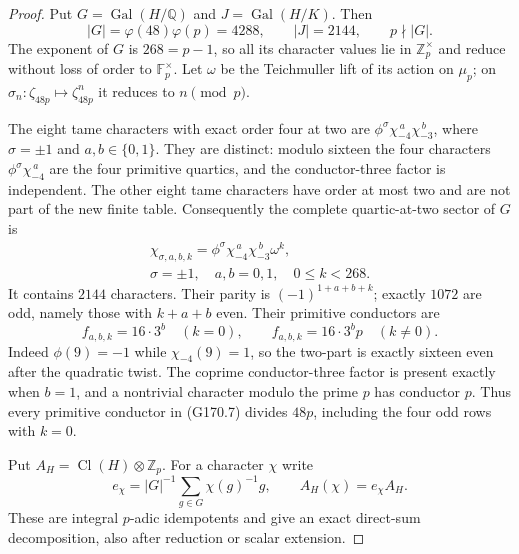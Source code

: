 \begin{proof}
Put $G=\operatorname{Gal}(H/\mathbb Q)$ and
$J=\operatorname{Gal}(H/K)$.
Then
\[
 |G|=\varphi(48)\varphi(p)=4288,\qquad
 |J|=2144,\qquad p\nmid|G|.
 \tag{G170.5}
\]
The exponent of $G$ is $268=p-1$, so all its character
values lie in $\mathbb Z_p^\times$ and reduce without loss
of order to $\mathbb F_p^\times$.
Let $\omega$ be the Teichmuller lift of its action on $\mu_p$;
on $\sigma_n:\zeta_{48p}\mapsto\zeta_{48p}^{n}$ it reduces
to $n\pmod p$.

The eight tame characters with exact order four at two are
$\phi^\sigma\chi_{-4}^{\,a}\chi_{-3}^{\,b}$,
where $\sigma=\pm1$ and $a,b\in\{0,1\}$.
They are distinct: modulo sixteen the four characters
$\phi^\sigma\chi_{-4}^{\,a}$ are the four primitive quartics,
and the conductor-three factor is independent.
The other eight tame characters have order at most two and
are not part of the new finite table.
Consequently the complete quartic-at-two sector of $G$ is
\[
 \begin{gathered}
 \chi_{\sigma,a,b,k}
       =\phi^\sigma\chi_{-4}^{\,a}\chi_{-3}^{\,b}\omega^k,\\
 \sigma=\pm1,\quad a,b=0,1,\quad0\leq k<268.
 \end{gathered}
 \tag{G170.6}
\]
It contains $2144$ characters.
Their parity is $(-1)^{1+a+b+k}$; exactly $1072$ are odd,
namely those with $k+a+b$ even.
Their primitive conductors are
\[
 f_{a,b,k}=16\cdot3^b\quad(k=0),\qquad
 f_{a,b,k}=16\cdot3^b p\quad(k\ne0).
 \tag{G170.7}
\]
Indeed $\phi(9)=-1$ while $\chi_{-4}(9)=1$, so the
two-part is exactly sixteen even after the quadratic twist.
The coprime conductor-three factor is present exactly when
$b=1$, and a nontrivial character modulo the prime $p$ has
conductor $p$.  Thus every primitive conductor in (G170.7)
divides $48p$, including the four odd rows with $k=0$.

Put $A_H=\operatorname{Cl}(H)\otimes\mathbb Z_p$.
For a character $\chi$ write
\[
 e_\chi=|G|^{-1}\sum_{g\in G}\chi(g)^{-1}g,
                     \qquad A_H(\chi)=e_\chi A_H.
 \tag{G170.8}
\]
These are integral $p$-adic idempotents and give an exact
direct-sum decomposition, also after reduction or scalar extension.


\end{proof}

